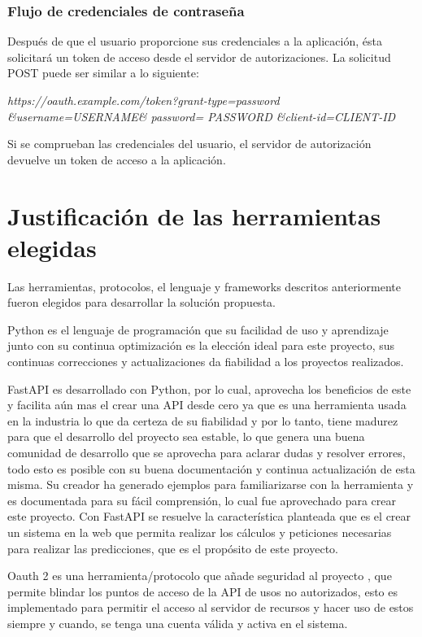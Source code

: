 \subsubsection{Flujo de credenciales de contraseña}
Después de que el usuario proporcione sus credenciales a la aplicación, ésta solicitará un token de acceso desde el servidor de autorizaciones. La solicitud POST puede ser similar a lo siguiente:

\textit{https://oauth.example.com/token?grant-type=password \&username=USERNAME\& password= PASSWORD \&client-id=CLIENT-ID}

Si se comprueban las credenciales del usuario, el servidor de autorización devuelve un token de acceso a la aplicación.\cite{Anicas2018}

%
\section{Justificación de las herramientas elegidas}
Las herramientas, protocolos, el lenguaje y frameworks descritos anteriormente fueron elegidos para desarrollar la solución propuesta. 

Python es el lenguaje de programación que su facilidad de uso y aprendizaje junto con su continua optimización es la elección ideal para este proyecto, sus continuas correcciones y actualizaciones da fiabilidad a los proyectos realizados.

FastAPI es desarrollado con Python, por lo cual, aprovecha los beneficios de este y facilita aún mas el crear una API desde cero ya que es una herramienta usada en la industria lo que da certeza de su fiabilidad y por lo tanto, tiene madurez para que el desarrollo del proyecto sea estable, lo que genera una buena comunidad de desarrollo que se aprovecha para aclarar dudas y resolver errores, todo esto es posible con su buena documentación y continua actualización de esta misma. Su creador ha generado ejemplos para familiarizarse con la herramienta y es documentada para su fácil comprensión, lo cual fue aprovechado para crear este proyecto.  Con FastAPI se resuelve la característica planteada que es el crear un sistema en la web que permita realizar los cálculos y peticiones necesarias para realizar las predicciones, que es el propósito de este proyecto.

Oauth 2 es una herramienta/protocolo que añade seguridad al proyecto \cite{Anicas2018, Magana2020}, que permite blindar los puntos de acceso de la API de usos no autorizados, esto es implementado para permitir el acceso al servidor de recursos y hacer uso de estos siempre y cuando, se tenga una cuenta válida y activa en el sistema.

